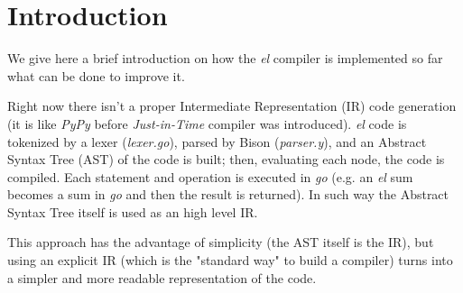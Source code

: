 \section*{Introduction}

We give here a brief introduction on how the \emph{el} compiler is implemented so far what can be done to improve it.

Right now there isn't a proper Intermediate Representation (IR) code generation (it is like \emph{PyPy} before \emph{Just-in-Time} compiler was introduced). \emph{el} code is tokenized by a lexer (\emph{lexer.go}), parsed by Bison (\emph{parser.y}), and an Abstract Syntax Tree (AST) of the code is built; then, evaluating each node, the code is compiled. Each statement and operation is executed in \emph{go} (e.g. an \emph{el} sum becomes a sum in \emph{go} and then the result is returned). In such way the Abstract Syntax Tree itself is used as an high level IR.

This approach has the advantage of simplicity (the AST itself is the IR), but using an explicit IR (which is the "standard way" to build a compiler) turns into a simpler and more readable representation of the code.

